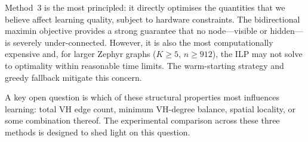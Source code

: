 \documentclass[11pt,a4paper]{article}
\begin{document}
Method~3 is the most principled: it directly optimises the quantities that we believe affect learning quality, subject to hardware constraints.  The bidirectional maximin objective provides a strong guarantee that no node---visible or hidden---is severely under-connected.  However, it is also the most computationally expensive and, for larger Zephyr graphs ($K\geq 5$, $n \geq 912$), the ILP may not solve to optimality within reasonable time limits.  The warm-starting strategy and greedy fallback mitigate this concern.

A key open question is which of these structural properties most influences learning: total VH edge count, minimum VH-degree balance, spatial locality, or some combination thereof.  The experimental comparison across these three methods is designed to shed light on this question.
\end{document}
